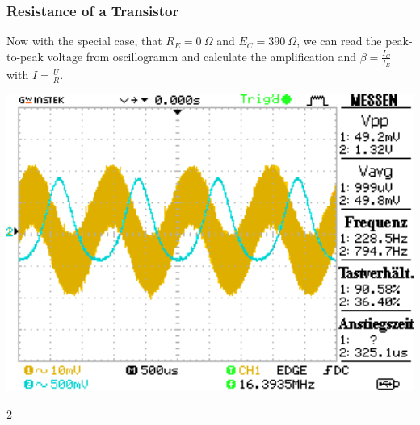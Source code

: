 \documentclass[a4paper,10pt]{article}
\newenvironment{Figure}
  {\par\medskip\noindent\minipage{\linewidth}}
  {\endminipage\par\medskip} %
\numberwithin{equation}{section}
\begin{document}
\begin{multicols}{2}
  \subsubsection{Resistance of a Transistor}
  Now with the special case, that $R_E=\SI{0}{\Omega}$ and $E_C=\SI{390}{\Omega}$, we can read the peak-to-peak voltage from oscillogramm and calculate the amplification and $\beta=\frac{I_C}{I_E}$ with $I=\frac{U}{R}$.

	\begin{Figure}
		\centering
		\includegraphics[width=1\textwidth]{../data/DS0022.png}
		\label{fig:rn}
	\end{Figure}



\end{multicols}{2}

\clearpage
\listoffigures
\listoftables



\end{document}
